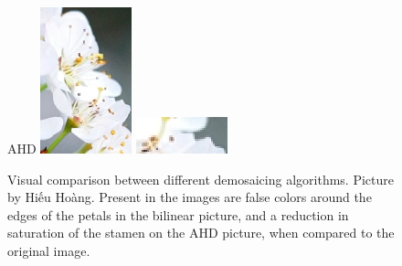 \begin{figure}[H]
\begin{minipage}{0.19\textwidth}
    \end{minipage}
    \hfill
    \begin{minipage}{0.19\textwidth}
        \centering
        AHD 
        \includegraphics[width=\textwidth]{img/flower/flower-ahd.png}
        \includegraphics[width=\textwidth]{img/flower/flower-close-ahd.png}
    \end{minipage}
    
    \caption{Visual comparison between different demosaicing algorithms.
    Picture by Hi\'{\^{e}}u Hoàng.
    Present in the images are false colors around the edges of the petals in the bilinear picture, and a reduction in saturation of the stamen on the AHD picture, when compared to the original image.}
    \label{fig:demosiac-comp}
\end{figure}